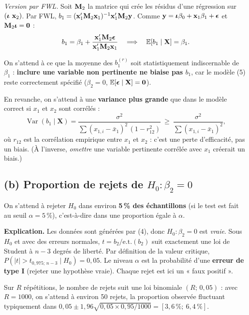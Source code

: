 \documentclass[11pt,a4paper]{article}
\newcommand{\vy}{\mathbf{y}}\newcommand{\vX}{\mathbf{X}}\newcommand{\vZ}{\mathbf{Z}}
\newcommand{\E}{\mathbb{E}}\newcommand{\Var}{\operatorname{Var}}\newcommand{\Cov}{\operatorname{Cov}}
\begin{document}
\textit{Version par FWL.} Soit $\mathbf{M}_2$ la matrice qui crée les résidus d'une régression sur $(\bm{\iota}\ \mathbf{x}_2)$. Par FWL, $b_1=(\vx_1'\Mm_2\vx_1)^{-1}\vx_1'\Mm_2\vy$. Comme $\vy=\vi\beta_0+\vx_1\beta_1+\veps$ et $\mathbf{M}_2\bm{\iota}=\mathbf 0$ :
\[
b_1=\beta_1+\frac{\vx_1'\Mm_2\veps}{\vx_1'\Mm_2\vx_1}
\quad\Longrightarrow\quad \E[b_1\mid\vX]=\beta_1 .
\]

\begin{reponse}
On s'attend à ce que la moyenne des $b_1^{(r)}$ soit statistiquement indiscernable de $\beta_1$ : \textbf{inclure une variable non pertinente ne biaise pas $b_1$}, car le modèle (5) reste correctement spécifié ($\beta_2=0$, $\E[\veps\mid\vX]=\mathbf 0$).

En revanche, on s'attend à une \textbf{variance plus grande} que dans le modèle correct si $x_1$ et $x_2$ sont corrélés :
\[
\Var(b_1\mid\vX)=\frac{\sigma^2}{\sum(x_{1,i}-\bar x_1)^2\,(1-r_{12}^2)}\ \ge\ \frac{\sigma^2}{\sum(x_{1,i}-\bar x_1)^2},
\]
où $r_{12}$ est la corrélation empirique entre $x_1$ et $x_2$ : c'est une perte d'efficacité, pas un biais. (À l'inverse, \emph{omettre} une variable pertinente corrélée avec $x_1$ créerait un biais.)
\end{reponse}

\subsection*{(b) Proportion de rejets de $H_0:\beta_2=0$}

\begin{reponse}
On s'attend à rejeter $H_0$ dans environ \textbf{5\,\% des échantillons} (si le test est fait au seuil $\alpha=5\,\%$), c'est-à-dire dans une proportion égale à $\alpha$.

\textbf{Explication.} Les données sont générées par (4), donc $H_0:\beta_2=0$ est \emph{vraie}. Sous $H_0$ et avec des erreurs normales, $t=b_2/\text{e.t.}(b_2)$ suit exactement une loi de Student à $n-3$ degrés de liberté. Par définition de la valeur critique, $P(|t|>t_{0{,}975;\,n-3}\mid H_0)=0{,}05$. Le niveau $\alpha$ est la probabilité d'une \textbf{erreur de type I} (rejeter une hypothèse vraie). Chaque rejet est ici un « faux positif ».

Sur $R$ répétitions, le nombre de rejets suit une loi binomiale $(R;\,0{,}05)$ : avec $R=1000$, on s'attend à environ 50 rejets, la proportion observée fluctuant typiquement dans $0{,}05\pm1{,}96\sqrt{0{,}05\times0{,}95/1000}=[3{,}6\,\%;\ 6{,}4\,\%]$.
\end{reponse}
\end{document}
